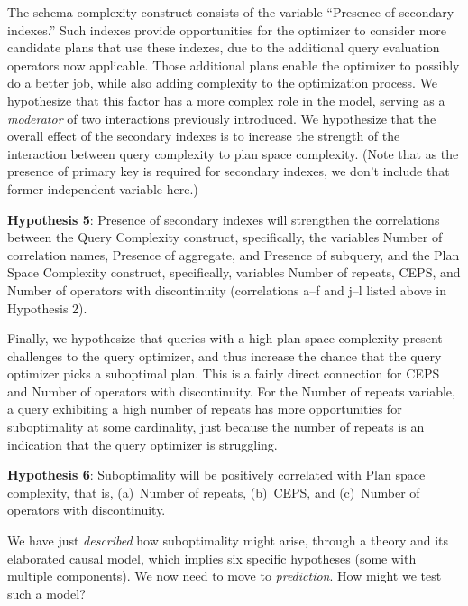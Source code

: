\documentclass[prodmode,acmtods]{acmsmall}
\begin{document}
\vspace{0.6em}
The schema complexity construct consists of the variable ``Presence of
secondary indexes.'' Such indexes provide opportunities for the optimizer to
consider more candidate plans that use these indexes, due to the additional
query evaluation operators now applicable. Those additional plans enable the optimizer to
possibly do a better job, while also adding complexity to the optimization
process. We hypothesize that this factor has a more complex role in the
model, serving as a {\em moderator} of two interactions previously
introduced. We hypothesize that the overall effect of the secondary indexes
is to increase the strength of the interaction between query
complexity to plan space complexity. (Note that as the presence of primary
key is required for secondary indexes, we don't include that former
independent variable here.)

\vspace{0.6em}\noindent
{\bf Hypothesis 5}: Presence of secondary indexes will strengthen
the correlations between the Query Complexity construct, specifically, the
variables Number of
correlation names, Presence of aggregate, and Presence of subquery, and
the Plan Space Complexity construct, specifically, variables Number of repeats, CEPS, and Number
of operators with discontinuity (correlations a--f and j--l listed above in
Hypothesis 2).

\vspace{0.6em}
Finally, we hypothesize that queries with a high plan space complexity
present challenges to the query optimizer, and thus increase the chance that
the query optimizer picks a suboptimal plan. This is a fairly direct
connection for CEPS and Number of operators with discontinuity. For the
Number of repeats variable, a query exhibiting a high number of repeats has
more opportunities for suboptimality at some cardinality, just because the
number of repeats is an indication that the query optimizer is struggling.

\vspace{0.6em}\noindent
{\bf Hypothesis 6}: Suboptimality will be positively correlated with Plan
space complexity, that is, (a)~Number of repeats, (b)~CEPS, and (c)~Number
of operators with discontinuity.

\vspace{0.6em}
We have just {\em described} how
suboptimality might arise, through a theory and its elaborated causal model,
which implies six specific hypotheses (some with multiple components).
We now need to move to {\em prediction}.
How might we test such a model? 
\end{document}
